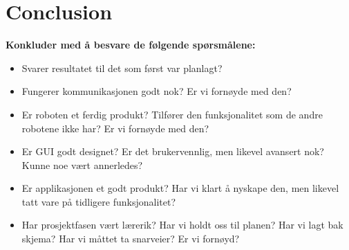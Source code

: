\section{Conclusion}

\textbf{Konkluder med å besvare de følgende spørsmålene:}
\begin{itemize}
    \item Svarer resultatet til det som først var planlagt?
    \item Fungerer kommunikasjonen godt nok? Er vi fornøyde med den?
    \item Er roboten et ferdig produkt? Tilfører den funksjonalitet som de andre robotene ikke har? Er vi fornøyde med den?
    \item Er GUI godt designet? Er det brukervennlig, men likevel avansert nok? Kunne noe vært annerledes?
    \item Er applikasjonen et godt produkt? Har vi klart å nyskape den, men likevel tatt vare på tidligere funksjonalitet?
    \item Har prosjektfasen vært lærerik? Har vi holdt oss til planen? Har vi lagt bak skjema? Har vi måttet ta snarveier? Er vi fornøyd?
\end{itemize}